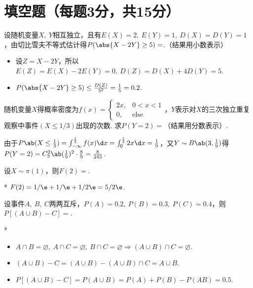 \section{填空题（每题3分，共15分）}
\begin{problem}
    设随机变量$X,\ Y$相互独立，且有$E(X)=2,\ E(Y)=1,\ D(X)=D(Y)=1$，由切比雪夫不等式估计得$P(\abs{X-2Y}\geq5)=$.（结果用小数表示）
\end{problem}
\begin{solution}
\begin{itemize}
    \item 设$Z=X-2Y$，所以$E(Z)=E(X)-2E(Y)=0,\ D(Z)=D(X)+4D(Y)=5$.
    \item $P(\abs{X-2Y}\geq5)\leq\frac{D(Z)}{5^2}=\frac15=0.2$.
\end{itemize}
\end{solution}

\begin{problem}
    随机变量$X$得概率密度为$f(x)=\begin{cases}
        2x, &0<x<1\\
        0, &\text{else}
    \end{cases}$，$Y$表示对$X$的三次独立重复观察中事件$(X\leq1/3)$出现的次数. 求$P(Y=2)=$（结果用分数表示）.
\end{problem}
\begin{solution}
    由于$P\ab(X\leq\frac13)=\int_{-\infty}^{\frac13}f(x)\d x=\int_0^{\frac13}2x\d x=\frac19$，又$Y\sim B\ab(3,\frac19)$得$P(Y=2)=C_3^2\ab(\frac19)^2\cdot\frac89=\frac{8}{243}$.
\end{solution}

\begin{problem}
    设$X\sim\pi(1)$，则$F(2)=$.
\end{problem}
\begin{solution}*
    $F(2)=1/\e+1/\e+1/2\e=5/2\e$.
\end{solution}

\begin{problem}
    设事件$A,\ B,\ C$两两互斥，$P(A)=0.2,\ P(B)=0.3,\ P(C)=0.4$，则$P[(A\cup B)-C]=$.
\end{problem}
\begin{solution}*
\begin{itemize}
    \item $A\cap B=\varnothing,\ A\cap C=\varnothing,\ B\cap C=\varnothing\Rightarrow(A\cup B)\cap C=\varnothing$.
    \item $(A\cup B)-C=(A\cup B)-(A\cup B)\cap C=A\cup B$.
    \item $P[(A\cup B)-C]=P(A\cup B)=P(A)+P(B)-P(AB)=0.5$.
\end{itemize}
\end{solution}

